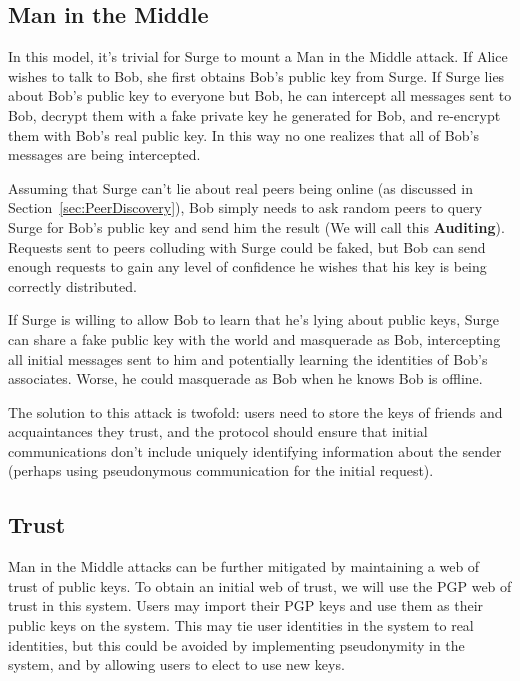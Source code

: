 \documentclass[twocolumn,11pt,english]{article}
\begin{document}
\subsection{Man in the Middle} 

In this model, it's trivial for Surge to mount a Man in the Middle attack. If Alice wishes to talk to Bob, she first obtains Bob's public key from Surge. If Surge lies about Bob's public key to everyone but Bob, he can intercept all messages sent to Bob, decrypt them with a fake private key he generated for Bob, and re-encrypt them with Bob's real public key. In this way no one realizes that all of Bob's messages are being intercepted. 

 Assuming that Surge can't lie about real peers being online (as discussed in Section~\ref{sec:PeerDiscovery}), Bob simply needs to ask random peers to query Surge for Bob's public key and send him the result (We will call this \textbf{Auditing}). Requests sent to peers colluding with Surge could be faked, but Bob can send enough requests to gain any level of confidence he wishes that his key is being correctly distributed. 

If Surge is willing to allow Bob to learn that he's lying about public keys, Surge can share a fake public key with the world and masquerade as Bob, intercepting all initial messages sent to him and potentially learning the identities of Bob's associates. Worse, he could masquerade as Bob when he knows Bob is offline.

The solution to this attack is twofold: users need to store the keys of friends and acquaintances they trust, and the protocol should ensure that initial communications don't include uniquely identifying information about the sender (perhaps using pseudonymous communication for the initial request).

\subsection{Trust}

Man in the Middle attacks can be further mitigated by maintaining a web of trust of public keys. To obtain an initial web of trust, we will use the PGP web of trust \cite{zimmermann1995official} in this system. Users may import their PGP keys and use them as their public keys on the system. This may tie user identities in the system to real identities, but this could be avoided by implementing pseudonymity in the system, and by allowing users to elect to use new keys. 
\end{document}
